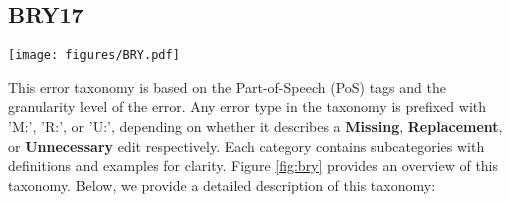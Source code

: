 \subsection{BRY17}
\label{subsec: errant}
\begin{figure*}[htbp]
    \centering
    \texttt{[image: figures/BRY.pdf]}
    \caption{Overview of the BRY17 Error Classification Taxonomy}
    \label{fig:bry}
\end{figure*}

This error taxonomy is based on the Part-of-Speech (PoS) tags and the granularity level of the error.
Any error type in the taxonomy is prefixed with 'M:', 'R:', or 'U:', depending on whether it describes a \textbf{Missing}, \textbf{Replacement}, or \textbf{Unnecessary} edit respectively.
Each category contains subcategories with definitions and examples for clarity. Figure \ref{fig:bry} provides an overview of this taxonomy. Below, we provide a detailed description of this taxonomy:

